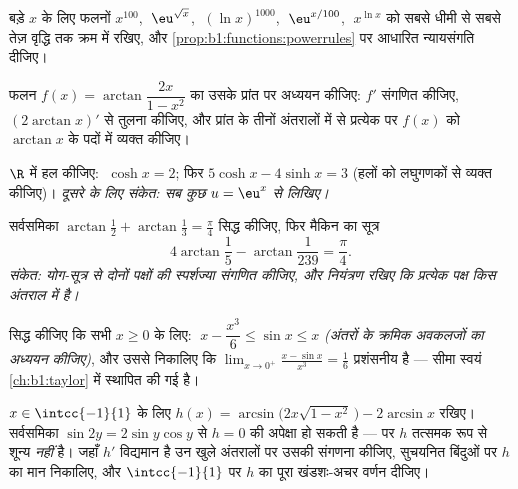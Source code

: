 \begin{exercise}[$\star$]\label{exo:b1:functions:5}
बड़े $x$ के लिए फलनों $x^{100}$, $\;\eu^{\sqrt x}$, $\;(\ln x)^{1000}$,
$\;\eu^{x/100}$, $\;x^{\ln x}$ को सबसे धीमी से सबसे तेज़ वृद्धि तक क्रम में
रखिए, और \cref{prop:b1:functions:powerrules} पर आधारित न्यायसंगति दीजिए।
\end{exercise}

\begin{exercise}[$\star\star$]\label{exo:b1:functions:6}
फलन $f(x) = \arctan\dfrac{2x}{1 - x^2}$ का उसके प्रांत पर अध्ययन कीजिए: $f'$
संगणित कीजिए, $(2\arctan x)'$ से तुलना कीजिए, और प्रांत के तीनों अंतरालों
में से प्रत्येक पर $f(x)$ को $\arctan x$ के पदों में व्यक्त कीजिए।
\end{exercise}

\begin{exercise}[$\star\star$]\label{exo:b1:functions:7}
$\R$ में हल कीजिए: $\;\cosh x = 2$; फिर $5\cosh x - 4 \sinh x = 3$ (हलों को
लघुगणकों से व्यक्त कीजिए)। \emph{दूसरे के लिए संकेत: सब कुछ $u = \eu^x$ से
लिखिए।}
\end{exercise}

\begin{exercise}[$\star\star$]\label{exo:b1:functions:8}
सर्वसमिका $\arctan\frac{1}{2} + \arctan\frac{1}{3} = \frac{\pi}{4}$ सिद्ध
कीजिए, फिर मैकिन का सूत्र
\[
4\arctan\frac 15 - \arctan\frac{1}{239} = \frac{\pi}{4}.
\]
\emph{संकेत: योग-सूत्र से दोनों पक्षों की स्पर्शज्या संगणित कीजिए, और
नियंत्रण रखिए कि प्रत्येक पक्ष किस अंतराल में है।}
\end{exercise}

\begin{exercise}[$\star\star$]\label{exo:b1:functions:9}
सिद्ध कीजिए कि सभी $x \geq 0$ के लिए: $\;x - \dfrac{x^3}{6} \leq \sin x \leq
x$ \emph{(अंतरों के क्रमिक अवकलजों का अध्ययन कीजिए)}, और उससे निकालिए कि
$\lim_{x \to 0^+} \frac{x - \sin x}{x^3} = \frac 16$ प्रशंसनीय है --- सीमा
स्वयं \cref{ch:b1:taylor} में स्थापित की गई है।
\end{exercise}

\begin{exercise}[$\star\star\star$]\label{exo:b1:functions:10}
$x \in \intcc{-1}{1}$ के लिए $h(x) = \arcsin\bigl(2x\sqrt{1 - x^2}\,\bigr) -
2\arcsin x$ रखिए। सर्वसमिका $\sin 2y = 2\sin y\cos y$ से $h = 0$ की अपेक्षा
हो सकती है --- पर $h$ तत्समक रूप से शून्य \emph{नहीं} है। जहाँ $h'$ विद्यमान
है उन खुले अंतरालों पर उसकी संगणना कीजिए, सुचयनित बिंदुओं पर $h$ का मान
निकालिए, और $\intcc{-1}{1}$ पर $h$ का पूरा खंडशः-अचर वर्णन दीजिए।
\end{exercise}

